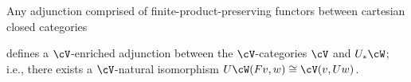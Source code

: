 \begin{lemma}\label{lem:enriched-cob-adjunction}
Any adjunction comprised of finite-product-preserving functors between cartesian closed categories
\begin{center}
\end{center}
defines a $\cV$-enriched adjunction between the $\cV$-categories $\cV$ and $U_*\cW$; i.e., there exists a $\cV$-natural isomorphism $U\cW(Fv,w) \cong \cV(v,Uw)$.
\end{lemma}
